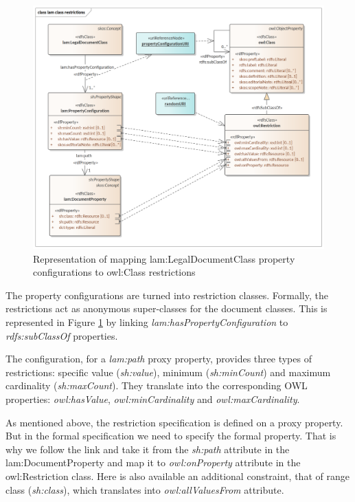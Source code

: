	\begin{figure}[h]
		\centering
		\includegraphics[width=15cm]{images/lam-class-restrictions.png}
		\caption{Representation of mapping lam:LegalDocumentClass property configurations to owl:Class restrictions}
		\label{fig:mapping-restriction}
	\end{figure}	

	The property configurations are turned into restriction classes. Formally, the restrictions act as anonymous super-classes for the document classes. This is represented in Figure \ref{fig:mapping-restriction} by linking \textit{lam:hasPropertyConfiguration} to \textit{rdfs:subClassOf} properties. 
	
	The configuration, for a \textit{lam:path} proxy property, provides three types of restrictions: specific value (\textit{sh:value}), minimum (\textit{sh:minCount}) and maximum cardinality (\textit{sh:maxCount}). They translate into the corresponding OWL properties: \textit{owl:hasValue}, \textit{owl:minCardinality} and \textit{owl:maxCardinality}.
	
	As mentioned above, the restriction specification is defined on a proxy property. But in the formal specification we need to specify the formal property. That is why we follow the link and take it from the \textit{sh:path} attribute in the lam:DocumentProperty and map it to \textit{owl:onProperty} attribute in the owl:Restriction class. Here is also available an additional constraint, that of range class (\textit{sh:class}), which translates into \textit{owl:allValuesFrom} attribute. 
	
